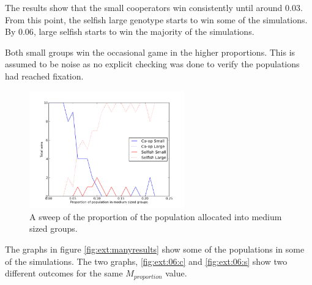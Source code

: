 \documentclass[11pt]{ecsarticle}
\begin{document}
The results show that the small cooperators win consistently until around $0.03$. 
From this point, the selfish large genotype starts to win some of the simulations. 
By $0.06$, large selfish starts to win the majority of the simulations.

Both small groups win the occasional game in the higher proportions. 
This is assumed to be noise as no explicit checking was done to verify the populations had reached fixation. 

\begin{figure}
 \centering
 \includegraphics[width=0.6\textwidth]{Code2/extresults.png}
 \caption{A sweep of the proportion of the population allocated into medium sized groups.}
 \label{fig:extresult}
\end{figure}

The graphs in figure \ref{fig:ext:manyresults} show some of the populations in some of the simulations. 
The two graphs, \ref{fig:ext:06:c} and \ref{fig:ext:06:s} show two different outcomes for the same $M_{proportion}$ value. 
\end{document}
